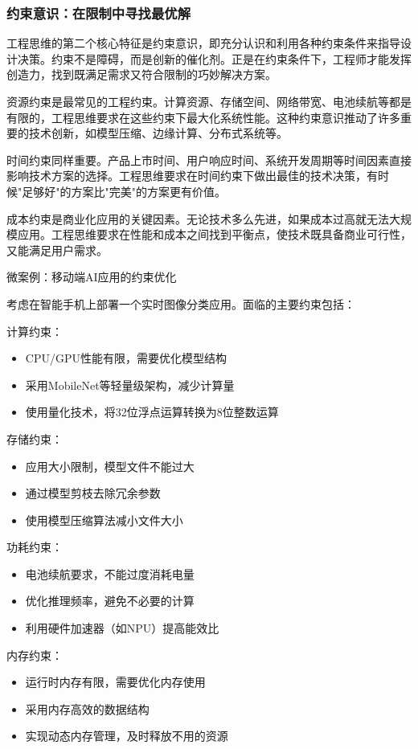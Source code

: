 \subsubsection{约束意识：在限制中寻找最优解}

工程思维的第二个核心特征是约束意识，即充分认识和利用各种约束条件来指导设计决策。约束不是障碍，而是创新的催化剂。正是在约束条件下，工程师才能发挥创造力，找到既满足需求又符合限制的巧妙解决方案。

资源约束是最常见的工程约束。计算资源、存储空间、网络带宽、电池续航等都是有限的，工程思维要求在这些约束下最大化系统性能。这种约束意识推动了许多重要的技术创新，如模型压缩、边缘计算、分布式系统等。

时间约束同样重要。产品上市时间、用户响应时间、系统开发周期等时间因素直接影响技术方案的选择。工程思维要求在时间约束下做出最佳的技术决策，有时候"足够好"的方案比"完美"的方案更有价值。

成本约束是商业化应用的关键因素。无论技术多么先进，如果成本过高就无法大规模应用。工程思维要求在性能和成本之间找到平衡点，使技术既具备商业可行性，又能满足用户需求。

微案例：移动端AI应用的约束优化

考虑在智能手机上部署一个实时图像分类应用。面临的主要约束包括：

计算约束：
\begin{itemize}
\item CPU/GPU性能有限，需要优化模型结构
\item 采用MobileNet等轻量级架构，减少计算量
\item 使用量化技术，将32位浮点运算转换为8位整数运算
\end{itemize}

存储约束：
\begin{itemize}
\item 应用大小限制，模型文件不能过大
\item 通过模型剪枝去除冗余参数
\item 使用模型压缩算法减小文件大小
\end{itemize}

功耗约束：
\begin{itemize}
\item 电池续航要求，不能过度消耗电量
\item 优化推理频率，避免不必要的计算
\item 利用硬件加速器（如NPU）提高能效比
\end{itemize}

内存约束：
\begin{itemize}
\item 运行时内存有限，需要优化内存使用
\item 采用内存高效的数据结构
\item 实现动态内存管理，及时释放不用的资源
\end{itemize}

